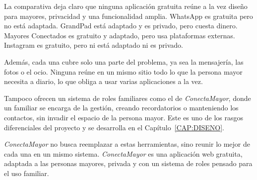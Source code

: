 La comparativa deja claro que ninguna aplicación gratuita reúne a la vez
diseño para mayores, privacidad y una funcionalidad amplia. WhatsApp es
gratuita pero no está adaptada. GrandPad está adaptado y es privado, pero
cuesta dinero. Mayores Conectados es gratuito y adaptado, pero usa
plataformas externas. Instagram es gratuito, pero ni está adaptado ni es
privado.

Además, cada una cubre solo una parte del problema, ya sea la mensajería,
las fotos o el ocio. Ninguna reúne en un mismo sitio todo lo que la persona
mayor necesita a diario, lo que obliga a usar varias aplicaciones a la vez.

Tampoco ofrecen un sistema de roles familiares como el de
\emph{ConectaMayor}, donde un familiar se encarga de la gestión, creando
recordatorios o manteniendo los contactos, sin invadir el espacio de la
persona mayor. Este es uno de los rasgos diferenciales del proyecto y se
desarrolla en el Capítulo~\ref{CAP:DISENO}.

\emph{ConectaMayor} no busca reemplazar a estas herramientas, sino reunir lo mejor de cada una en un mismo sistema. \emph{ConectaMayor} es una aplicación web gratuita, adaptada a
las personas mayores, privada y con un sistema de roles pensado para el uso
familiar.
